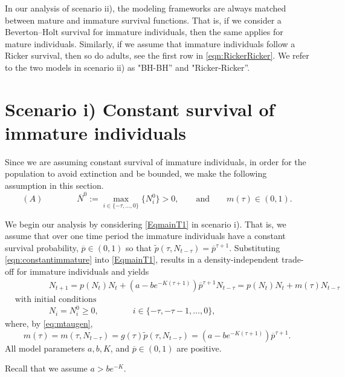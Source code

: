 \documentclass{article}
\numberwithin{theorem}{section}
\begin{document}
{In our analysis of scenario ii), the modeling frameworks are always matched between mature and immature survival functions. That is, if we consider a Beverton--Holt survival for immature individuals, then the same applies for mature individuals. Similarly, if we assume that immature individuals follow a Ricker survival, then so do adults, see the first row in \eqref{eqn:RickerRicker}. We refer to the two models in scenario ii) as "BH-BH'' and "Ricker-Ricker''.

\section{Scenario i) \textemdash Constant survival of immature individuals}

Since we are assuming constant survival of immature individuals, in order for the population to avoid extinction and be  bounded, we make the following assumption in this section.
\begin{equation}\label{eq:A}
(A) \qquad \qquad \overline{N}^0:=\max_{i\in \{-\tau, \ldots, 0\}}\{N_i^0\}>0, \qquad \mbox{and}\qquad m(\tau)\in (0,1).
\end{equation}

We begin our analysis by considering \eqref{EqmainT1} in scenario i). That is, we assume that  over one time period the immature individuals have a constant survival probability, $\overline{p}\in (0,1)$ so that $\widetilde{p}(\tau, N_{t-\tau})=\overline{p}^{\tau+1}$. Substituting \eqref{eqn:constantimmature} into \eqref{EqmainT1}, results in a density-independent trade-off for immature individuals and yields
\begin{align}\label{EqT1C1}
& \qquad \qquad N_{t+1}=p(N_t)N_t + \left(a - b e^{-K(\tau+1)}\right)
\overline{p}^{\tau+1} N_{t-\tau}=p(N_t)N_t+m(\tau)N_{t-\tau}\nonumber \\
  & \mbox{with initial conditions}\\
 & \qquad \qquad N_i=N_i^0 \geq 0, \qquad \qquad i  \in \{-\tau, -\tau-1, \ldots, 0\}, \nonumber
\end{align}
where, by \eqref{eq:mtaugen}, 
\begin{equation}\label{eq:mtau}
m(\tau)=m(\tau, N_{t-\tau})=g(\tau)\widetilde{p}(\tau, N_{t-\tau})=\left(a - b e^{-K(\tau+1)}\right)
\overline{p}^{\tau+1}.
\end{equation}
All model parameters $a, b, K$, and  $\overline{p}\in (0,1)$ are positive.

Recall that we assume $a>be^{-K}$.   


}
\end{document}
